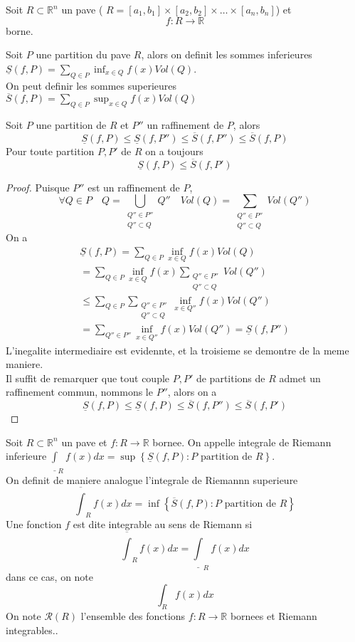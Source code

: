 \documentclass[../main.tex]{subfiles}
\begin{document}
	Soit $R \subset \mathbb{R}^n$ un pave  ( $R = [ a_1,b_1] \times [ a_2,b_2] \times \ldots \times [ a_n,b_n] $) et 
	\[ 
	f: R \to \mathbb{R}
	\]
	borne.\\
\begin{defn}
	Soit $P$ une partition du pave $R$, alors on definit les sommes inferieures $ \underline { S} ( f,P) = \sum_{Q \in P}  \inf_{x \in Q} f( x) Vol( Q)   $.\\
	On peut definir les sommes superieures $\overline{S} ( f,P) = \sum_{Q \in P} \sup_{x \in Q} f( x) Vol( Q) $	
\end{defn}
\begin{lemma}
Soit $P$ une partition de $R$ et $P''$ un raffinement de $P$, alors
\[ 
	\underline { S}  ( f,P)  \leq \underline{S} ( f,P'') \leq \overline{S}( f,P'') \leq  \overline{S}( f,P) 
\]
Pour toute partition $P,P'$ de $R$ on a toujours 
\[ 
	\underline{S} ( f,P)  \leq \overline{S} ( f,P') 
\]
\end{lemma}
\begin{proof}
Puisque $P''$ est un raffinement de $P$,
\[ 
	\forall Q \in P \quad Q = \bigcup_{\substack{ Q''\in P''\\Q'' \subset Q	 }} Q'' \quad Vol( Q) = \sum_{\substack{ Q'' \in P''\\ Q'' \subset Q }} Vol( Q'') 
\]
On a 
\begin{align*}
	\underline { S} ( f,P)  = \sum_{Q \in P}^{ }\inf_{x \in Q} f( x) Vol( Q) \\
	= \sum_{Q\in P} \inf_{x \in Q} f( x) \sum_{ \substack { Q '' \in P'' \\ Q'' \subset Q} }^{ } Vol( Q'') \\
	\leq \sum_{Q \in P} \sum_{ \substack { Q'' \in P''\\Q'' \subset Q} } \inf_{x \in Q''} f( x) Vol( Q'') \\
	= \sum_{Q'' \in P''} \inf_{x \in Q''} f( x) Vol( Q'') = \underline{S} ( f,P'') 	
\end{align*}
L'inegalite intermediaire est evidennte, et la troisieme se demontre de la meme maniere.\\
Il suffit de remarquer que tout couple $P,P'$ de partitions de $R$ admet un raffinement commun, nommons le $P''$, alors on a
\[ 
	\underline { S} ( f,P)  \leq  \underline { S} ( f,P)  \leq  \overline{S}( f,P'')  \leq  \overline{S}( f,P') 
\]
\end{proof}
\begin{defn}
	Soit $R \subset \mathbb{R}^n$ un pave et $f : R \to \mathbb{R}$ bornee. On appelle integrale de Riemann inferieure $\underline{ \int }_R f( x) dx= \sup \left\{ \underline { S} ( f,P) :  P \text{ partition de  } R \right\} $.\\
	On definit de maniere analogue l'integrale de Riemannn superieure
\[ 
\overline{ \int }_R f( x) dx= \inf \left\{ \overline { S} ( f,P) :  P \text{ partition de  } R \right\} 
\]
Une fonction $f$ est dite integrable au sens de Riemann si 
\[ 
	\overline{ \int }_R f( x) dx = \underline{ \int }_R f( x) dx
\]
dans ce cas, on note 
\[ 
	\int_R f( x) dx 
\]
On note $ \mathcal{R}( R) $ l'ensemble des fonctions $f: R \to \mathbb{R}$ bornees et Riemann integrables..
\end{defn}
\end{document}
